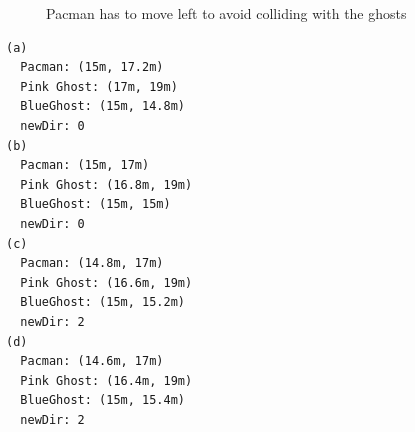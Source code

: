 \begin{figure}[!h]
	\caption{Pacman has to move left to avoid colliding with the ghosts} 
	\label{fig:PacmanFleeing}
\end{figure}

\begin{lstlisting}[float,caption={Values for the stream test},label=lst:pmStreamValues]
(a)
  Pacman: (15m, 17.2m) 
  Pink Ghost: (17m, 19m) 
  BlueGhost: (15m, 14.8m) 
  newDir: 0
(b)	
  Pacman: (15m, 17m) 
  Pink Ghost: (16.8m, 19m) 
  BlueGhost: (15m, 15m) 
  newDir: 0
(c)	
  Pacman: (14.8m, 17m) 
  Pink Ghost: (16.6m, 19m) 
  BlueGhost: (15m, 15.2m) 
  newDir: 2
(d)	
  Pacman: (14.6m, 17m) 
  Pink Ghost: (16.4m, 19m)
  BlueGhost: (15m, 15.4m)
  newDir: 2
\end{lstlisting}

